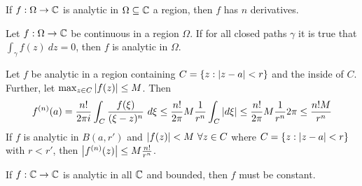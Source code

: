 \begin{theorem}
    If $f: \Omega \rightarrow \mathbb{C}$ is analytic in $\Omega \subseteq \mathbb{C}$ a region,
    then $f$ has $n$ derivatives.
\end{theorem}

\begin{theorem}
    Let $f: \Omega \rightarrow \mathbb{C}$ be continuous in a region $\Omega$. If for all
    closed paths $\gamma$ it is true that $\int_\gamma f(z) \ dz = 0$, then $f$
    is analytic in $\Omega$.
\end{theorem}

\begin{theorem}
    Let $f$ be analytic in a region containing $C = \left\{ z :
    \left\vert z-a \right\vert < r \right\}$ and the inside of $C$. Further, let $\max_{z \in C} \left\vert f(z) \right\vert
    \leq M$. Then
    \begin{align*}
        f^{(n)} (a) = \frac{n!}{2 \pi i} \int_C \frac{f(\xi)}{(\xi - z)^n} \ d \xi
        \leq \frac{n!}{2 \pi} M \frac{1}{r^n} \int_C \left\vert d \xi \right\vert
        \leq \frac{n!}{2 \pi} M \frac{1}{r^n} 2 \pi
        \leq \frac{n! M}{r^n}
    \end{align*}
    If $f$ is analytic in $B(a,r')$ and $\left\vert f(z) \right\vert < M \ \forall z \in C$ where
    $C = \left\{ z : \left\vert z-a \right\vert < r \right\}$ with $r<r'$, then
    $\left\vert f^{(n)} (z) \right\vert \leq M \frac{n!}{r^n}$.
\end{theorem}

\begin{theorem}
    If $f: \mathbb{C} \rightarrow \mathbb{C}$ is analytic in all $\mathbb{C}$ and bounded, then $f$ must
    be constant.
\end{theorem}
